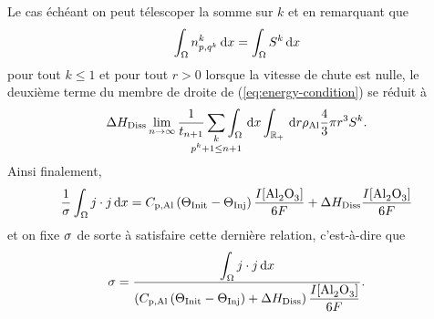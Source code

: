 Le cas échéant on peut télescoper la somme sur $k$ et en remarquant que
\begin{equation*}
  \int_\Omega n_{p,q^k}^k\,\mathrm dx = \int_\Omega S^k\,\mathrm dx
\end{equation*}
pour tout $k \leq 1$ et pour tout $r > 0$ lorsque la vitesse de chute
est nulle, le deuxième terme du membre de droite de
(\ref{eq:energy-condition}) se réduit à
\begin{equation*}
  {\aluminadissolutionenthalpy}\lim_{n\to\infty}\frac{1}{t_{n+1}}\sum_{\mathclap{\substack{k\\ p^k +
  1 \leq n + 1}}}\int_\Omega\intd{x}\int_\rplus\intd{r}\aluminadensity
  \frac{4}{3}\pi r^3 S^k.
\end{equation*}
Ainsi finalement,
\begin{equation*}
  \frac{1}{\sigma}\int_\Omega j\cdot j\intd{x}
  =\aluminahc\parent{\tinit-\tinj}\frac{I[\cee{Al2O3}]}{6F} + {\aluminadissolutionenthalpy}\frac{I[\cee{Al2O3}]}{6F}
\end{equation*}
et on fixe $\sigma$ de sorte à satisfaire cette dernière
relation, c'est-à-dire que
\begin{equation}\label{eq:conductivity-condition}
  \conductivity = \frac{\displaystyle\int_\Omega j\cdot j\intd{x}}{\parent{\aluminahc\parent{\tinit-\tinj} + {\aluminadissolutionenthalpy} }
    \displaystyle\frac{I[\cee{Al2O3}]}{6F}}.
\end{equation}


